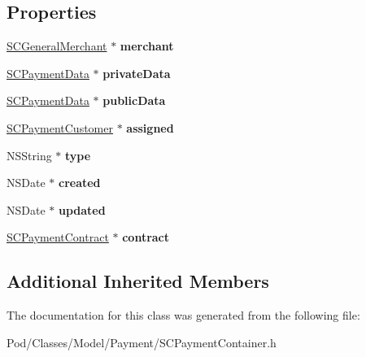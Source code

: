 \subsection*{Properties}
\begin{DoxyCompactItemize}
\item 
\hyperlink{interface_s_c_general_merchant}{S\+C\+General\+Merchant} $\ast$ {\bfseries merchant}\hypertarget{interface_s_c_payment_container_a41201c880d86dab9c8630d1cebbabdd7}{}\label{interface_s_c_payment_container_a41201c880d86dab9c8630d1cebbabdd7}

\item 
\hyperlink{interface_s_c_payment_data}{S\+C\+Payment\+Data} $\ast$ {\bfseries private\+Data}\hypertarget{interface_s_c_payment_container_acd0f05bb07189ceb21382d73e9b215e8}{}\label{interface_s_c_payment_container_acd0f05bb07189ceb21382d73e9b215e8}

\item 
\hyperlink{interface_s_c_payment_data}{S\+C\+Payment\+Data} $\ast$ {\bfseries public\+Data}\hypertarget{interface_s_c_payment_container_a57339a404340441a36eeb7f66ea1eb9c}{}\label{interface_s_c_payment_container_a57339a404340441a36eeb7f66ea1eb9c}

\item 
\hyperlink{interface_s_c_payment_customer}{S\+C\+Payment\+Customer} $\ast$ {\bfseries assigned}\hypertarget{interface_s_c_payment_container_a1a02ef6422924788a0a0e2463d31348e}{}\label{interface_s_c_payment_container_a1a02ef6422924788a0a0e2463d31348e}

\item 
N\+S\+String $\ast$ {\bfseries type}\hypertarget{interface_s_c_payment_container_a038e854a82a29395d24cacadb690d5e0}{}\label{interface_s_c_payment_container_a038e854a82a29395d24cacadb690d5e0}

\item 
N\+S\+Date $\ast$ {\bfseries created}\hypertarget{interface_s_c_payment_container_a328d17d871219e82408ca3edad76daf7}{}\label{interface_s_c_payment_container_a328d17d871219e82408ca3edad76daf7}

\item 
N\+S\+Date $\ast$ {\bfseries updated}\hypertarget{interface_s_c_payment_container_a9e47a3f3fb53f527294ca9c98e0ac251}{}\label{interface_s_c_payment_container_a9e47a3f3fb53f527294ca9c98e0ac251}

\item 
\hyperlink{interface_s_c_payment_contract}{S\+C\+Payment\+Contract} $\ast$ {\bfseries contract}\hypertarget{interface_s_c_payment_container_ab4136127cbd54d930ef2fbc248694d11}{}\label{interface_s_c_payment_container_ab4136127cbd54d930ef2fbc248694d11}

\end{DoxyCompactItemize}
\subsection*{Additional Inherited Members}


The documentation for this class was generated from the following file\+:\begin{DoxyCompactItemize}
\item 
Pod/\+Classes/\+Model/\+Payment/S\+C\+Payment\+Container.\+h\end{DoxyCompactItemize}
